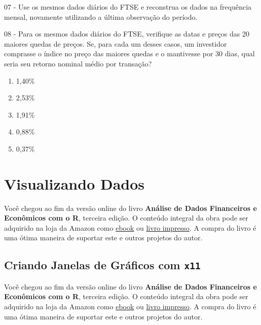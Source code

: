 \documentclass[
  11pt,
]{book}
\providecommand{\tightlist}{%
  \setlength{\itemsep}{0pt}\setlength{\parskip}{0pt}}
\newenvironment{pleasebuyit}
{\begin{noteblock}
		
	} {\end{noteblock}}
\begin{document}
07 -
Use os mesmos dados diários do FTSE e reconstrua os dados na frequência mensal, novamente utilizando a última observação do período.

08 -
Para os mesmos dados diários do FTSE, verifique as datas e preços das 20 maiores quedas de preços. Se, para cada um desses casos, um investidor comprasse o índice no preço das maiores quedas e o mantivesse por 30 dias, qual seria seu retorno nominal médio por transação?

\begin{enumerate}
\def\labelenumi{\alph{enumi})}
\tightlist
\item
  1,40\%
\item
  2,53\%
\item
  1,91\%
\item
  0,88\%
\item
  0,37\%
\end{enumerate}

\hypertarget{figuras}{%
\chapter{Visualizando Dados}\label{figuras}}

\begin{pleasebuyit}
Você chegou ao fim da versão online do livro \textbf{Análise de Dados
Financeiros e Econômicos com o R}, terceira edição. O conteúdo integral
da obra pode ser adquirido na loja da Amazon como
\href{https://www.amazon.com.br/dp/B08WNC27ZY}{ebook} ou
\href{https://www.amazon.com/dp/B08WP8CCDB}{livro impresso}. A compra do
livro é uma ótima maneira de suportar este e outros projetos do autor.
\end{pleasebuyit}

\hypertarget{criando-janelas-de-gruxe1ficos-com-x11}{%
\section{\texorpdfstring{Criando Janelas de Gráficos com \texttt{x11}}{Criando Janelas de Gráficos com x11}}\label{criando-janelas-de-gruxe1ficos-com-x11}}

\begin{pleasebuyit}
Você chegou ao fim da versão online do livro \textbf{Análise de Dados
Financeiros e Econômicos com o R}, terceira edição. O conteúdo integral
da obra pode ser adquirido na loja da Amazon como
\href{https://www.amazon.com.br/dp/B08WNC27ZY}{ebook} ou
\href{https://www.amazon.com/dp/B08WP8CCDB}{livro impresso}. A compra do
livro é uma ótima maneira de suportar este e outros projetos do autor.
\end{pleasebuyit}
\end{document}
